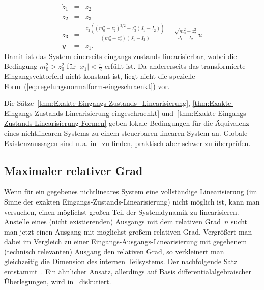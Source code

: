 \begin{example}
\[\begin{array}{lcl}
\dot{z}_{1} & = & z_{2}\\
\dot{z}_{2} & = & z_{3}\\
\dot{z}_{3} & = & \frac{z_{2}\left(\left(m_{0}^{2}-z_{2}^{2}\right)^{3/2}+z_{3}^{2}(J_{1}-I_{2})\right)}{\left(m_{0}^{2}-z_{2}^{2}\right)\left(J_{1}-I_{2}\right)}-\frac{\sqrt{m_{0}^{2}-z_{2}^{2}}}{J_{1}-I_{2}}\,u\\
y & = & z_{1}.
\end{array}
\]
Damit ist das System einerseits eingangs-zustands-linearisierbar,
wobei die Bedingung $m_{0}^{2}>z_{0}^{2}$ für $|x_{1}|<\tfrac{\pi}{2}$
erfüllt ist. Da andererseits das transformierte Eingangsvektorfeld
nicht konstant ist, liegt nicht die spezielle Form~(\ref{eq:regelungsnormalform-eingeschraenkt})
vor.
\end{example}

Die Sätze~\ref{thm:Exakte-Eingangs-Zustands_Linearisierung}, \ref{thm:Exakte-Eingangs-Zustands-Linearisierung-eingeschraenkt}
und~\ref{thm:Exakte-Eingangs-Zustands-Linearisierung-Formen} geben
lokale Bedingungen für die Äquivalenz eines nichtlinearen Systems
zu einem steuerbaren linearen System an. Globale Existenzaussagen
sind u.\,a. in~\cite{hunt1983,boothby1984,dayawansa1985,respondek1986}
zu finden, praktisch aber schwer zu überprüfen.

\subsection{Maximaler relativer Grad\label{subsec:Maximaler-relativer-Grad}}

Wenn für ein gegebenes nichtlineares System eine vollständige Linearisierung
(im Sinne der exakten Eingangs-Zustands-Linearisierung) nicht möglich
ist, kann man versuchen, einen möglichst großen Teil der Systemdynamik
zu linearisieren. Anstelle eines (nicht existierenden) Ausgangs mit
dem relativen Grad~$n$ sucht man jetzt einen Ausgang mit möglichst
großem relativen Grad. Vergrößert man dabei im Vergleich zu einer
Eingangs-Ausgangs-Linearisierung mit gegebenem (technisch relevanten)
Ausgang den relativen Grad, so verkleinert man gleichzeitig die Dimension
des internen Teil\-systems. Der nachfolgende Satz entstammt~\cite[Theorem~4.8.2]{isidori3}.
Ein ähnlicher Ansatz, allerdings auf Basis differentialalgebraischer
Überlegungen, wird in~\cite{zikmund2006,conte2007,maalouf2011ifac}
diskutiert.

